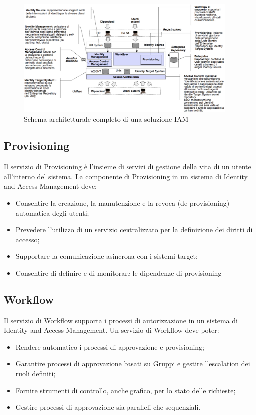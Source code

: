 \begin{figure}
\centering
\includegraphics[width=0.95\textwidth]{img/esempioarchitettura.eps}
\caption{Schema architetturale completo di una soluzione IAM} \label{esempioarchitettura}
\end{figure}

\subsection{Provisioning}
Il servizio di Provisioning è l’insieme di servizi di gestione della
vita di un utente all'interno del sistema.
La componente di Provisioning in un sistema di Identity and Access Management
deve:
\begin{itemize}
\item Consentire la creazione, la manutenzione e la revoca (de-provisioning)
automatica degli utenti;
\item Prevedere l’utilizzo di un servizio centralizzato per la definizione dei
diritti di accesso;
\item Supportare la comunicazione asincrona con i sistemi target;
\item Consentire di definire e di monitorare le dipendenze di provisioning
\end{itemize}

\subsection{Workflow}
Il servizio di Workflow supporta i processi di autorizzazione in un sistema di
Identity and Access Management.
Un servizio di Workflow deve poter:
\begin{itemize}
\item Rendere automatico i processi di approvazione e provisioning;
\item Garantire processi di approvazione basati su Gruppi e gestire l’escalation dei
ruoli definiti;
\item Fornire strumenti di controllo, anche grafico, per lo stato delle richieste;
\item Gestire processi di approvazione sia paralleli che sequenziali.
\end{itemize}

